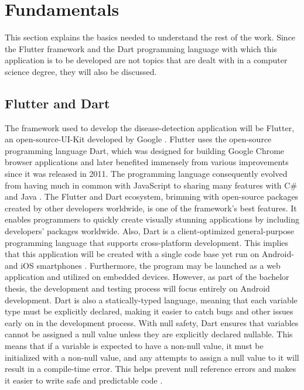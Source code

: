 

\chapter{Fundamentals}
This section explains the basics needed to understand the rest of the work. Since the Flutter framework and the Dart programming language with which this application is to be developed are not topics that are dealt with in a computer science degree, they will also be discussed.

\section{Flutter and Dart}
The framework used to develop the disease-detection application will be Flutter, an open-source-UI-Kit developed by Google  \cite{.flutterDEV}. Flutter uses the open-source programming language Dart, which was designed for building Google Chrome browser applications and later benefited immensely from various improvements since it was released in 2011. The programming language consequently evolved from having much in common with JavaScript to sharing many features with C\# and Java \cite{.javadart}. The Flutter and Dart ecosystem, brimming with open-source packages created by other developers worldwide, is one of the framework's best features. It enables programmers to quickly create visually stunning applications by including developers' packages worldwide. Also, Dart is a client-optimized general-purpose programming language that supports cross-platform development. This implies that this application will be created with a single code base yet run on Android- and iOS smartphones \cite{.dartoverview}.
Furthermore, the program may be launched as a web application and utilized on embedded devices. However, as part of the bachelor thesis, the development and testing process will focus entirely on Android development. Dart is also a statically-typed language, meaning that each variable type must be explicitly declared, making it easier to catch bugs and other issues early on in the development process. With null safety, Dart ensures that variables cannot be assigned a null value unless they are explicitly declared nullable. This means that if a variable is expected to have a non-null value, it must be initialized with a non-null value, and any attempts to assign a null value to it will result in a compile-time error. This helps prevent null reference errors and makes it easier to write safe and predictable code  \cite{.dartoverview}.

